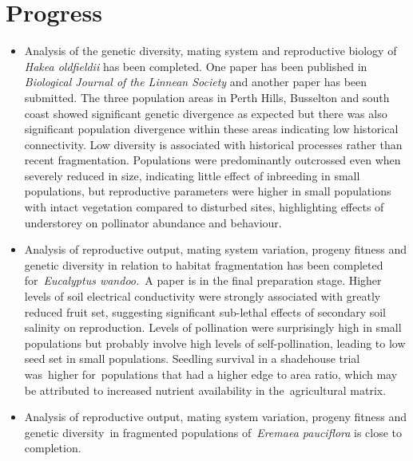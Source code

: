 \documentclass[version=last,
    paper=a4, %
    10pt, %
    usenames,
    dvipsnames,
    oneside, %
    headings=openany, %
    DIV=15 %
]{scrbook}
\begin{document}
\section*{Progress}
\begin{itemize}
\itemsep1pt\parskip0pt
\item
  Analysis of the genetic diversity, mating system and reproductive
  biology of \emph{Hakea oldfieldii} has been completed. One paper has
  been published in \emph{Biological Journal of the Linnean Society} and
  another paper has been submitted. The three population areas in Perth
  Hills, Busselton and south coast showed significant genetic divergence
  as expected but there was also significant population divergence
  within these areas indicating low historical connectivity. Low
  diversity is associated with historical processes rather than recent
  fragmentation. Populations were predominantly outcrossed even when
  severely reduced in size, indicating little effect of inbreeding in
  small populations, but reproductive parameters were higher in small
  populations with intact vegetation compared to disturbed sites,
  highlighting effects of understorey on pollinator abundance and
  behaviour.
\item
  Analysis of reproductive output, mating system variation, progeny
  fitness and genetic diversity in relation to habitat fragmentation has
  been completed for~\emph{Eucalyptus wandoo.}~A paper is in the final
  preparation stage. Higher levels of soil electrical conductivity were
  strongly associated with greatly reduced fruit set, suggesting
  significant sub-lethal effects of secondary soil salinity on
  reproduction. Levels of pollination were surprisingly high in small
  populations but probably involve high levels of self-pollination,
  leading to low seed set in small populations. Seedling survival in a
  shadehouse trial was~higher for~populations that had a higher edge to
  area ratio, which may be attributed to increased nutrient availability
  in the~agricultural matrix.
\item
  Analysis of reproductive output, mating system variation, progeny
  fitness and genetic diversity~in fragmented populations
  of~\emph{Eremaea pauciflora} is close to completion.
\end{itemize}
\end{document}
